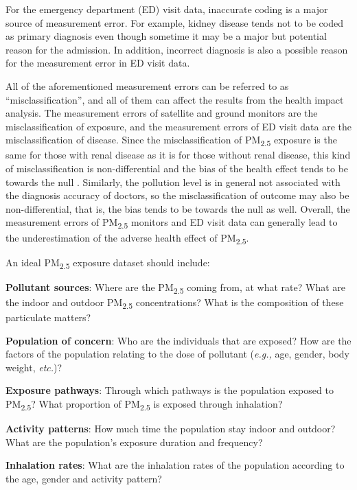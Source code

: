 \documentclass[11pt]{article}
\newcommand{\tsub}{\textsubscript}
\begin{document}
\begin{enumerate*}[{[a)]}]
    For the emergency department (ED) visit data, inaccurate coding is a major source of measurement error. For example, kidney disease tends not to be coded as primary diagnosis even though sometime it may be a major but potential reason for the admission. In addition, incorrect diagnosis is also a possible reason for the measurement error in ED visit data. 
    
    \item All of the aforementioned measurement errors can be referred to as ``misclassification'', and all of them can affect the results from the health impact analysis. The measurement errors of satellite and ground monitors are the misclassification of exposure, and the measurement errors of ED visit data are the misclassification of disease. Since the misclassification of PM\tsub{2.5} exposure is the same for those with renal disease as it is for those without renal disease, this kind of misclassification is non-differential and the bias of the health effect tends to be towards the null \citep{sarnat2015fine}. Similarly, the pollution level is in general not associated with the diagnosis accuracy of doctors, so the misclassification of outcome may also be non-differential, that is, the bias tends to be towards the null as well. Overall, the measurement errors of PM\tsub{2.5} monitors and ED visit data can generally lead to the underestimation of the adverse health effect of PM\tsub{2.5}.
    
    \item An ideal PM\tsub{2.5} exposure dataset should include: {
        \begin{itemize*}
            \item \textbf{Pollutant sources}: Where are the PM\tsub{2.5} coming from, at what rate? What are the indoor and outdoor PM\tsub{2.5} concentrations? What is the composition of these particulate matters?
            \item \textbf{Population of concern}: Who are the individuals that are exposed? How are the factors of the population relating to the dose of pollutant (\textit{e.g.,} age, gender, body weight, \textit{etc.})? 
            \item \textbf{Exposure pathways}: Through which pathways is the population exposed to PM\tsub{2.5}? What proportion of PM\tsub{2.5} is exposed through inhalation?
            \item \textbf{Activity patterns}: How much time the population stay indoor and outdoor? What are the population's exposure duration and frequency? 
            \item \textbf{Inhalation rates}: What are the inhalation rates of the population according to the age, gender and activity pattern?
        \end{itemize*}
    }
\end{enumerate*}
\end{document}
